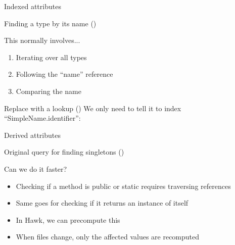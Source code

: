\begin{frame}[fragile]{Indexed attributes}
  \begin{block}{Finding a type by its name ()}
    
  \end{block}

  \begin{block}{This normally involves...}
    \begin{enumerate}
    \item Iterating over all types
    \item Following the ``name'' reference
    \item Comparing the name
    \end{enumerate}
  \end{block}

  \begin{alertblock}{Replace with a lookup ()}
    \vspace{.3em}
    We only need to tell it to index ``SimpleName.identifier'':
    
  \end{alertblock}
\end{frame}



\begin{frame}[fragile]{Derived attributes}
  \begin{block}{Original query for finding singletons ()}
    
  \end{block}

  \begin{block}{Can we do it faster?}
    \begin{itemize}
    \item Checking if a method is public or static requires traversing
      references
    \item Same goes for checking if it returns an instance of itself
    \item In Hawk, \alert{we can precompute this}
    \item When files change, only the affected values are recomputed
    \end{itemize}
  \end{block}
\end{frame}


